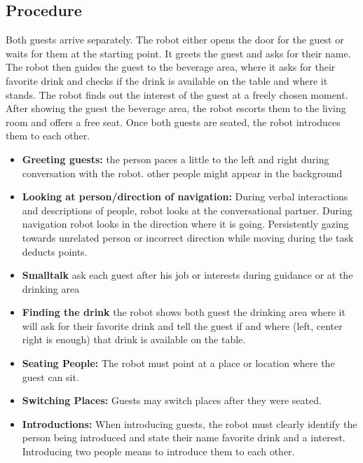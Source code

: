 \subsection*{Procedure}
Both guests arrive separately. The robot either opens the door for the guest or waits for them at the starting point. It greets the guest and asks for their name. The robot then guides the guest to the beverage area, where it asks for their favorite drink and checks if the drink is available on the table and where it stands. The robot finds out the interest of the guest at a freely chosen moment. After showing the guest the beverage area, the robot escorts them to the living room and offers a free seat. Once both guests are seated, the robot introduces them to each other.
\begin{itemize}
	\item \textbf{Greeting guests:} the person paces a little to the left and right during conversation with the robot. other people might appear in the background
	
	\item \textbf{Looking at person/direction of navigation:} During verbal interactions and descriptions of people, robot 
	looks at the conversational partner. During navigation robot looks in the direction where it is going. Persistently gazing towards unrelated 
	person or incorrect direction while moving during the task deducts points.
    
    \item \textbf{Smalltalk} ask each guest after his job or interests during guidance or at the drinking area
    
    \item \textbf{Finding the drink} the robot shows both guest the drinking area where it will ask for their favorite drink and tell the guest if and where (left, center right is enough) that drink is available on the table. 
	
	\item \textbf{Seating People:} The robot must point at a place or location where the guest can sit.
	
	\item \textbf{Switching Places:} Guests may switch places after they were seated.
	
	\item \textbf{Introductions:} When introducing guests, the robot must clearly identify the person being introduced and state their name favorite drink and a interest. Introducing two people means to introduce them to each other. 
\end{itemize}

